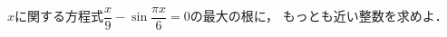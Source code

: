 \documentclass[../../main.tex]{subfiles}
\begin{document}
$x$に関する方程式$\displaystyle\dfrac{x}{9}-\sin\dfrac{\pi x}{6}=0$の最大の根に，
もっとも近い整数を求めよ．
\end{document}

